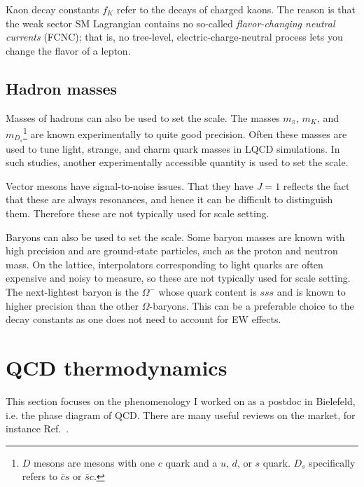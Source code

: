 Kaon decay constants $f_K$ refer to the decays of charged kaons.
The reason is that the weak sector SM Lagrangian contains no so-called
{\it flavor-changing neutral currents} (FCNC); that is,
no tree-level, electric-charge-neutral process lets you change the
flavor of a lepton.

\subsection{Hadron masses}

Masses of hadrons can also be used to set the scale. The masses
$m_\pi$, $m_K$, and $m_{D_s}$\footnote{$D$ mesons
are mesons with one $c$ quark and a $u$, $d$, or $s$ quark.
$D_s$ specifically refers to $\bar{c}s$ or $\bar{s}c$.}
are known experimentally to quite good precision. Often these masses are used to
tune light, strange, and charm quark masses in LQCD simulations.
In such studies, another experimentally accessible quantity is used
to set the scale.

Vector mesons have signal-to-noise issues. That they have $J=1$ reflects the
fact that these are always resonances, and hence it can be difficult to
distinguish them. Therefore these are not typically used for scale setting.

Baryons can also be used to set the scale. Some baryon masses are known with
high precision and are ground-state particles, such as the proton and neutron
mass. On the lattice, interpolators corresponding to light quarks are often
expensive and noisy to measure, so these are not typically used for scale
setting. The next-lightest baryon 
is the $\Omega^-$ whose quark content is $sss$ and is known to higher precision
than the other $\Omega$-baryons. This can be a preferable choice to the decay
constants as one does not need to account for EW effects. 


\section{QCD thermodynamics}\label{sec:QCDtherm} 


This section focuses on the phenomenology I worked on as a postdoc in
Bielefeld, i.e. the phase diagram of QCD. There are many useful reviews
on the market, for instance Ref.~\cite{ding_thermodynamics_2015}.

